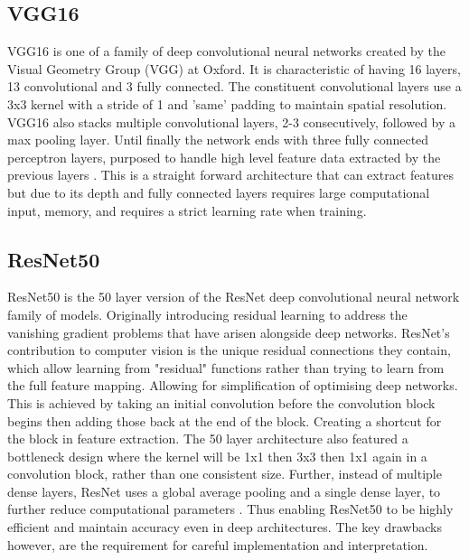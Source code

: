 \documentclass[10pt,twocolumn,letterpaper]{article}
\begin{document}
\subsection{VGG16}
VGG16 is one of a family of deep convolutional neural networks created by the Visual Geometry Group (VGG) at Oxford. It is characteristic of having 16 layers, 13 convolutional and 3 fully connected. The constituent convolutional layers use a 3x3 kernel with a stride of 1 and 'same' padding to maintain spatial resolution. VGG16 also stacks multiple convolutional layers, 2-3 consecutively, followed by a max pooling layer. Until finally the network ends with three fully connected perceptron layers, purposed to handle high level feature data extracted by the previous layers \cite{original_vgg}. This is a straight forward architecture that can extract features but due to its depth and fully connected layers requires large computational input, memory, and requires a strict learning rate when training. 

\subsection{ResNet50}
ResNet50 is the 50 layer version of the ResNet deep convolutional neural network family of models. Originally introducing residual learning to address the vanishing gradient problems that have arisen alongside deep networks. ResNet's contribution to computer vision is the unique residual connections they contain, which allow learning from "residual" functions rather than trying to learn from the full feature mapping. Allowing for simplification of optimising deep networks. This is achieved by taking an initial convolution before the convolution block begins then adding those back at the end of the block. Creating a shortcut for the block in feature extraction. The 50 layer architecture also featured a bottleneck design where the kernel will be 1x1 then 3x3 then 1x1 again in a convolution block, rather than one consistent size. Further, instead of multiple dense layers, ResNet uses a global average pooling and a single dense layer, to further reduce computational parameters \cite{original_resnet} \cite{finetuningresnet50}. Thus enabling ResNet50 to be highly efficient and maintain accuracy even in deep architectures. The key drawbacks however, are the requirement for careful implementation and interpretation. 
\end{document}
